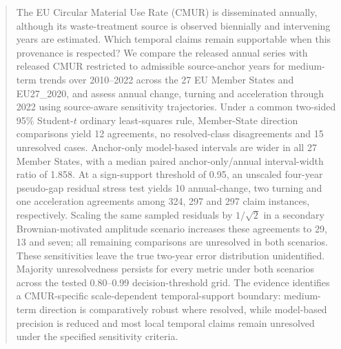 \begin{abstract}
The EU Circular Material Use Rate (CMUR) is disseminated annually, although its waste-treatment source is observed biennially and intervening years are estimated. Which temporal claims remain supportable when this provenance is respected? We compare the released annual series with released CMUR restricted to admissible source-anchor years for medium-term trends over 2010--2022 across the 27 EU Member States and EU27\_2020, and assess annual change, turning and acceleration through 2022 using source-aware sensitivity trajectories. Under a common two-sided 95\% Student-$t$ ordinary least-squares rule, Member-State direction comparisons yield 12 agreements, no resolved-class disagreements and 15 unresolved cases. Anchor-only model-based intervals are wider in all 27 Member States, with a median paired anchor-only/annual interval-width ratio of 1.858. At a sign-support threshold of 0.95, an unscaled four-year pseudo-gap residual stress test yields 10 annual-change, two turning and one acceleration agreements among 324, 297 and 297 claim instances, respectively. Scaling the same sampled residuals by $1/\sqrt{2}$ in a secondary Brownian-motivated amplitude scenario increases these agreements to 29, 13 and seven; all remaining comparisons are unresolved in both scenarios. These sensitivities leave the true two-year error distribution unidentified. Majority unresolvedness persists for every metric under both scenarios across the tested 0.80--0.99 decision-threshold grid. The evidence identifies a CMUR-specific scale-dependent temporal-support boundary: medium-term direction is comparatively robust where resolved, while model-based precision is reduced and most local temporal claims remain unresolved under the specified sensitivity criteria.
\end{abstract}
